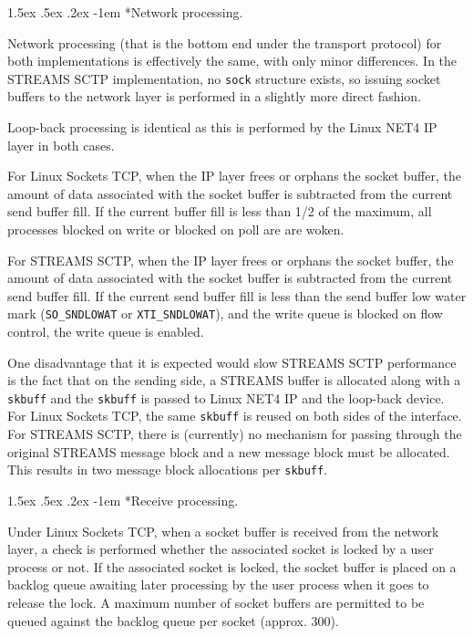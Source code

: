 \documentclass[letterpaper,final,notitlepage,twocolumn,10pt,twoside]{article}
\makeatletter
\renewcommand\paragraph{\@startsection{paragraph}{4}{\z@}%
                                    {1.5ex \@plus .5ex \@minus .2ex}%
                                    {-1em}%
                                    {\normalfont\normalsize\bfseries\slshape}}
\makeatother
\begin{document}
\paragraph*{Network processing.}

Network processing (that is the bottom end under the transport protocol) for both implementations is
effectively the same, with only minor differences.  In the STREAMS SCTP implementation, no
\texttt{sock} structure exists, so issuing socket buffers to the network layer is performed in a
slightly more direct fashion.

Loop-back processing is identical as this is performed by the Linux NET4 IP layer in both cases.

For Linux Sockets TCP, when the IP layer frees or orphans the socket buffer, the amount of data
associated with the socket buffer is subtracted from the current send buffer fill.  If the current
buffer fill is less than 1/2 of the maximum, all processes blocked on write or blocked on poll are
are woken.

For STREAMS SCTP, when the IP layer frees or orphans the socket buffer, the amount of data
associated with the socket buffer is subtracted from the current send buffer fill.  If the current
send buffer fill is less than the send buffer low water mark (\texttt{SO\_SNDLOWAT} or
\texttt{XTI\_SNDLOWAT}), and the write queue is blocked on flow control, the write queue is enabled.

One disadvantage that it is expected would slow STREAMS SCTP performance is the fact that on the
sending side, a STREAMS buffer is allocated along with a \texttt{skbuff} and the \texttt{skbuff} is
passed to Linux NET4 IP and the loop-back device.  For Linux Sockets TCP, the same \texttt{skbuff}
is reused on both sides of the interface.  For STREAMS SCTP, there is (currently) no mechanism for
passing through the original STREAMS message block and a new message block must be allocated.  This
results in two message block allocations per \texttt{skbuff}.

\paragraph*{Receive processing.}

Under Linux Sockets TCP, when a socket buffer is received from the network layer, a check is
performed whether the associated socket is locked by a user process or not.  If the associated
socket is locked, the socket buffer is placed on a backlog queue awaiting later processing by the
user process when it goes to release the lock.  A maximum number of socket buffers are permitted to
be queued against the backlog queue per socket (approx. 300).
\end{document}
